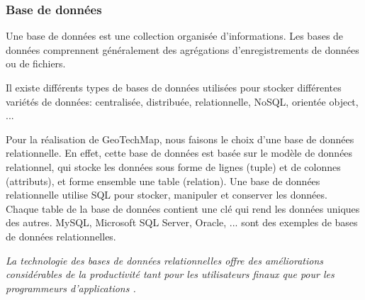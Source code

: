          \subsubsection{Base de données}
         Une base de données est une collection organisée d'informations. Les bases de données
         comprennent généralement des agrégations d'enregistrements de données ou de fichiers. 
         \par 
         Il existe différents types de bases de données utilisées pour stocker différentes 
         variétés de données: centralisée, distribuée, relationnelle, NoSQL, 
         orientée object, ... \cite{typedb}
         \par 
         Pour la réalisation de GeoTechMap, nous faisons le choix d'une base de données relationnelle.
         En effet, cette base de données est basée sur le modèle de données relationnel, qui stocke les 
         données sous forme de lignes (tuple) et de colonnes (attributs), et forme ensemble une table 
         (relation). Une base de données relationnelle utilise SQL pour stocker, manipuler et conserver 
         les données. Chaque table de la base de données 
         contient une clé qui rend les données uniques des autres. MySQL, Microsoft SQL Server, Oracle, ... 
         sont des exemples de bases de données relationnelles.
         \par 
         \textit{La technologie des bases de données relationnelles offre des améliorations considérables 
         de la productivité tant pour les utilisateurs finaux que pour les programmeurs d'applications \cite{codd1989relational}.}
